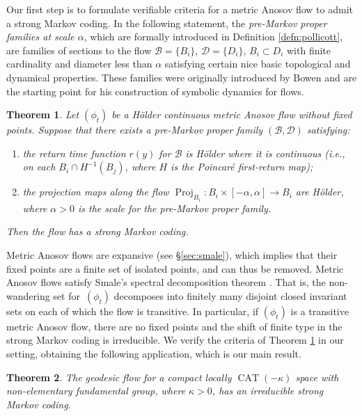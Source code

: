 \documentclass[11pt]{article}
\newcommand{\ie}{i.e.,\xspace}
\let\mathcal\mathscr
\newtheorem{thmx}{Theorem}
\theoremstyle{definition}
\numberwithin{equation}{section}
\DeclareMathOperator{\CAT}{CAT}
\DeclareMathOperator{\Proj}{Proj}
\newcommand\DDD{\mathcal D}
\newcommand\BBB{\mathcal B}
\begin{document}
Our first step is to formulate verifiable criteria for a metric Anosov flow to admit a strong Markov coding. In the following statement, the \emph{pre-Markov proper families at scale $\alpha$}, which are formally introduced in Definition \ref{defn:pollicott}, are families of sections to the flow $\BBB=\{B_i\}$, $\DDD=\{D_i\}$, $B_i \subset D_i$ with finite cardinality and diameter less than $\alpha$ satisfying certain nice basic topological and dynamical properties. These families were originally introduced by Bowen and are the starting point for his construction of symbolic dynamics for flows.
\begin{thmx} \label{t.usefulversion}
Let $(\phi_t)$ be a Hölder continuous metric Anosov flow without fixed points. Suppose that there exists a pre-Markov proper family $(\BBB, \DDD)$ satisfying:
\begin{enumerate}
\item\label{t.usefulversion1} the return time function $r(y)$ for $\BBB$ is Hölder where it is continuous (\ie on each $B_i \cap H^{-1}(B_j)$, where $H$ is the Poincaré first-return map);

\item\label{t.usefulversion2} the projection maps along the flow $\Proj_{B_{i}}: B_i \times [-\alpha, \alpha] \to B_i$ are Hölder, where $\alpha>0$ is the scale for the pre-Markov proper family.
\end{enumerate}
Then the flow has a strong Markov coding.
\end{thmx}
Metric Anosov flows are expansive (see \S \ref{sec:smale}), which implies that their fixed points are a finite set of isolated points, and can thus be removed. Metric Anosov flows satisfy Smale's spectral decomposition theorem \cite{pollicott}. That is, the non-wandering set for~$(\phi_t)$ decomposes into finitely many disjoint closed invariant sets on each of which the flow is transitive. In particular, if $(\phi_t)$ is a transitive metric Anosov flow, there are no fixed points and the shift of finite type in the strong Markov coding is irreducible. We verify the criteria of Theorem \ref{t.usefulversion} in our setting, obtaining the following application, which is our main result.

\begin{thmx} \label{t.main}
The geodesic flow for a compact locally $\CAT(-\kappa)$ space with non-elementary fundamental group, where $\kappa>0$, has an irreducible strong Markov coding.
\end{thmx}
\end{document}
